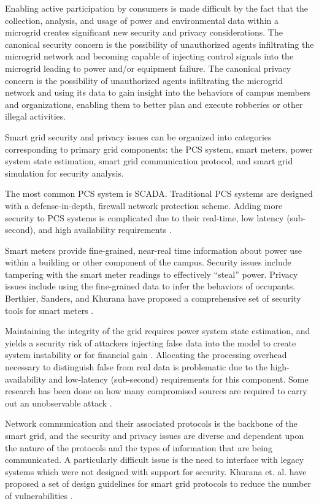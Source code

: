 Enabling active participation by consumers is made difficult by the fact
that the collection, analysis, and usage of power and environmental data
within a microgrid creates significant new security and privacy
considerations.  The canonical security concern is the possibility of
unauthorized agents infiltrating the microgrid network and becoming capable
of injecting control signals into the microgrid leading to power and/or
equipment failure.  The canonical privacy concern is the possibility of
unauthorized agents infiltrating the microgrid network and using its data
to gain insight into the behaviors of campus members and organizations,
enabling them to better plan and execute robberies or other illegal
activities.

Smart grid security and privacy issues can be organized into categories
corresponding to primary grid components: the PCS system, smart meters,
power system state estimation, smart grid communication protocol, and smart
grid simulation for security analysis. 

The most common PCS system is SCADA.  Traditional PCS 
systems are designed with a defense-in-depth, firewall network protection scheme.   
Adding  more security to PCS systems is complicated due to
their real-time, low latency (sub-second), and high availability
requirements \cite{Valdes2009}. 

Smart meters provide fine-grained, near-real time information about power
use within a building or other component of the campus.  Security issues
include tampering with the smart meter readings to effectively ``steal''
power. Privacy issues include using the fine-grained data to infer the
behaviors of occupants. Berthier, Sanders, and Khurana have proposed a
comprehensive set of security tools for smart meters \cite{Berthier2010}.

Maintaining the integrity of the grid requires power system state
estimation, and yields a security risk of attackers injecting false data
into the model to create system instability or for financial gain
\cite{Xie2010}.  Allocating the processing overhead necessary to
distinguish false from real data is problematic due to the
high-availability and low-latency (sub-second) requirements for this
component. Some research has been done on how many compromised sources are
required to carry out an unobservable attack \cite{Kosut2010}.

Network communication and their associated protocols is the backbone of the
smart grid, and the security and privacy issues are diverse and dependent
upon the nature of the protocols and the types of information that are
being communicated. A particularly difficult issue is the need to interface
with legacy systems which were not designed with support for security.
Khurana et. al. have proposed a set of design guidelines for smart grid
protocols to reduce the number of vulnerabilities \cite{Khurana2010}.

